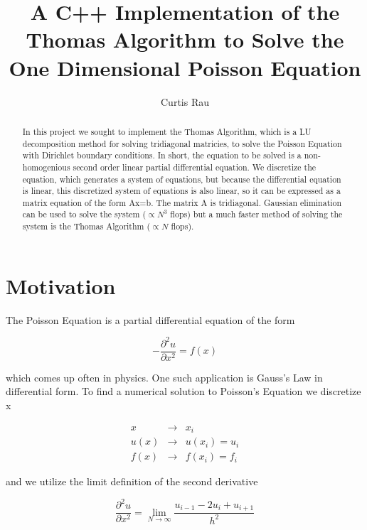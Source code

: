 \documentclass{article}
\author{Curtis Rau}
\title{A C++ Implementation of the Thomas Algorithm to Solve the One Dimensional Poisson Equation}
\begin{document}
\maketitle

\begin{abstract}
In this project we sought to implement the Thomas Algorithm, which is a LU decomposition method for solving tridiagonal matricies, to solve the Poisson Equation with Dirichlet boundary conditions.  In short, the equation to be solved is a non-homogenious second order linear partial differential equation.  We discretize the equation, which generates a system of equations, but because the differential equation is linear, this discretized system of equations is also linear, so it can be expressed as a matrix equation of the form Ax=b.  The matrix A is tridiagonal.  Gaussian elimination can be used to solve the system ($\propto N^3$ flops) but a much faster method of solving the system is the Thomas Algorithm ($\propto N$ flops).
\end{abstract}


\section{Motivation}
The Poisson Equation is a partial differential equation of the form

\begin{equation}
	- \frac{\partial^2 u}{\partial x^2} = f(x)
\end{equation}

which comes up often in physics.  One such application is Gauss’s Law in differential form.  To find a numerical solution to Poisson’s Equation we discretize x

\begin{equation}
\begin{aligned}
	x    &\to & x_i          \\
	u(x) &\to & u(x_i) = u_i \\
	f(x) &\to & f(x_i) = f_i
\end{aligned}
\end{equation}

and we utilize the limit definition of the second derivative

\begin{equation}
	\frac{\partial^2 u}{\partial x^2} = \lim_{N \to \infty} \frac{u_{i-1} - 2 u_i + u_{i+1}}{h^2}
\end{equation}
\end{document}
